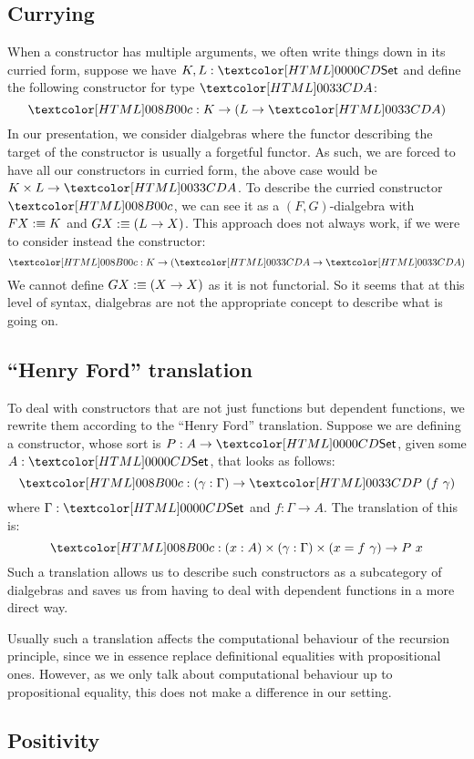 \subsection{Currying}

When a constructor has multiple arguments, we often write things down
in its curried form, \eg suppose we have $K, L : \Set$ and define the
following constructor for type $\Aty$:
$$
\Ac : K \to (L \to \Aty)
$$
In our presentation, we consider dialgebras where the functor
describing the target of the constructor is usually a forgetful
functor. As such, we are forced to have all our constructors in
curried form, \eg the above case would be $K \times L \to \Aty$. To
describe the curried constructor $\Ac$, we can see it as a
$(F,G)$-dialgebra with $F X :\equiv K$ and $G X :\equiv (L \to X)$.
This approach does not always work, if we were to consider instead the
constructor:
$$
\Ac : K \to (\Aty \to \Aty)
$$
We cannot define $G X :\equiv (X \to X)$ as it is not functorial. So
it seems that at this level of syntax, dialgebras are not the
appropriate concept to describe what is going on.

\subsection{``Henry Ford'' translation}

To deal with constructors that are not just functions but dependent
functions, we rewrite them according to the ``Henry Ford''
translation. Suppose we are defining a constructor, whose sort is
$P : A \to \Set$, given some $A : \Set$, that looks as follows:
$$
\Pc : (\gamma : \Gamma) \to \Pty\ (f\ \gamma)
$$
where $\Gamma : \Set$ and $f : \Gamma \to A$. The translation of this
is:
$$
\Pc : (x : A) \times (\gamma : \Gamma) \times (x = f\ \gamma) \to P\ x
$$
Such a translation allows us to describe such constructors as a
subcategory of dialgebras and saves us from having to deal with
dependent functions in a more direct way. 

Usually such a translation affects the computational behaviour of the
recursion principle, since we in essence replace definitional
equalities with propositional ones. However, as we only talk about
computational behaviour up to propositional equality, this does not
make a difference in our setting.

\subsection{Positivity}

